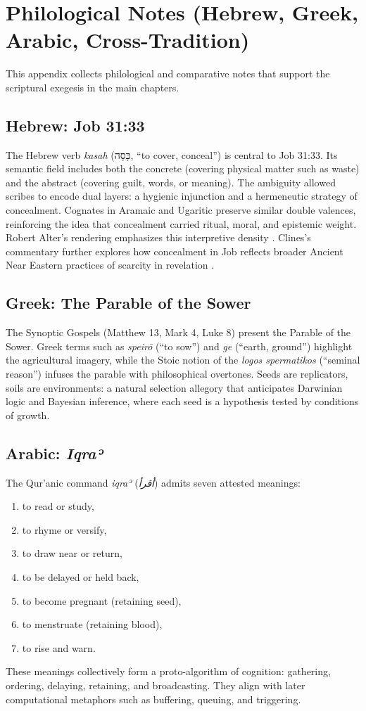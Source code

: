 \appendix

\chapter{Philological Notes (Hebrew, Greek, Arabic, Cross-Tradition)}
This appendix collects philological and comparative notes that support the scriptural exegesis in the main chapters. 

\section*{Hebrew: Job 31:33}
The Hebrew verb \emph{kasah} (כָּסָה, “to cover, conceal”) is central to Job 31:33. 
Its semantic field includes both the concrete (covering physical matter such as waste) and the abstract (covering guilt, words, or meaning). 
The ambiguity allowed scribes to encode dual layers: a hygienic injunction and a hermeneutic strategy of concealment.  
Cognates in Aramaic and Ugaritic preserve similar double valences, reinforcing the idea that concealment carried ritual, moral, and epistemic weight.  
Robert Alter’s rendering emphasizes this interpretive density \citep{alter2010wisdom}.  
Clines’s commentary further explores how concealment in Job reflects broader Ancient Near Eastern practices of scarcity in revelation \citep{clines1989job}.  

\section*{Greek: The Parable of the Sower}
The Synoptic Gospels (Matthew 13, Mark 4, Luke 8) present the Parable of the Sower.  
Greek terms such as \emph{speirō} (“to sow”) and \emph{ge} (“earth, ground”) highlight the agricultural imagery, 
while the Stoic notion of the \emph{logos spermatikos} (“seminal reason”) infuses the parable with philosophical overtones.  
Seeds are replicators, soils are environments: a natural selection allegory that anticipates Darwinian logic and Bayesian inference, 
where each seed is a hypothesis tested by conditions of growth.  

\section*{Arabic: \emph{Iqraʾ}}
The Qur’anic command \emph{iqraʾ} (\emph{أقرأ}) admits seven attested meanings:  
\begin{enumerate}
  \item to read or study,  
  \item to rhyme or versify,  
  \item to draw near or return,  
  \item to be delayed or held back,  
  \item to become pregnant (retaining seed),  
  \item to menstruate (retaining blood),  
  \item to rise and warn.  
\end{enumerate}
These meanings collectively form a proto-algorithm of cognition: gathering, ordering, delaying, retaining, and broadcasting.  
They align with later computational metaphors such as buffering, queuing, and triggering.  

